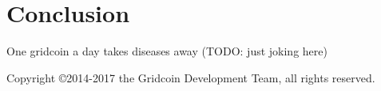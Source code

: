 \section{Conclusion}

One gridcoin a day takes diseases away (TODO: just joking here)




Copyright \copyright  2014-2017 the Gridcoin Development Team, all rights reserved.
